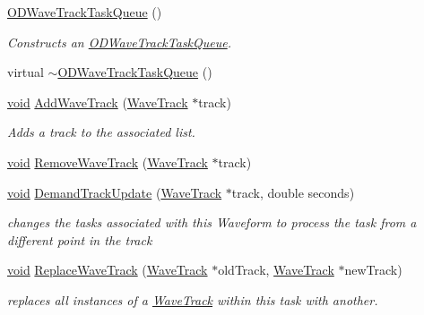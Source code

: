 \begin{DoxyCompactItemize}
\item 
\hyperlink{class_o_d_wave_track_task_queue_a1f17dcbeccc80ea43c7f17d0e57cc719}{O\+D\+Wave\+Track\+Task\+Queue} ()
\begin{DoxyCompactList}\small\item\em Constructs an \hyperlink{class_o_d_wave_track_task_queue}{O\+D\+Wave\+Track\+Task\+Queue}. \end{DoxyCompactList}\item 
virtual \hyperlink{class_o_d_wave_track_task_queue_a4dd991f46f246d38b8ccd29de965211b}{$\sim$\+O\+D\+Wave\+Track\+Task\+Queue} ()
\item 
\hyperlink{sound_8c_ae35f5844602719cf66324f4de2a658b3}{void} \hyperlink{class_o_d_wave_track_task_queue_abe296a4b592fda1425ebed95cd5368c7}{Add\+Wave\+Track} (\hyperlink{class_wave_track}{Wave\+Track} $\ast$track)
\begin{DoxyCompactList}\small\item\em Adds a track to the associated list. \end{DoxyCompactList}\item 
\hyperlink{sound_8c_ae35f5844602719cf66324f4de2a658b3}{void} \hyperlink{class_o_d_wave_track_task_queue_ae5a6b6f1492f226c786c8bc9c1a52f42}{Remove\+Wave\+Track} (\hyperlink{class_wave_track}{Wave\+Track} $\ast$track)
\item 
\hyperlink{sound_8c_ae35f5844602719cf66324f4de2a658b3}{void} \hyperlink{class_o_d_wave_track_task_queue_a50600260d6e33d0d120ab1d1178a4c20}{Demand\+Track\+Update} (\hyperlink{class_wave_track}{Wave\+Track} $\ast$track, double seconds)
\begin{DoxyCompactList}\small\item\em changes the tasks associated with this Waveform to process the task from a different point in the track \end{DoxyCompactList}\item 
\hyperlink{sound_8c_ae35f5844602719cf66324f4de2a658b3}{void} \hyperlink{class_o_d_wave_track_task_queue_a89ffe5e2d7ed615108ae59374dc44192}{Replace\+Wave\+Track} (\hyperlink{class_wave_track}{Wave\+Track} $\ast$old\+Track, \hyperlink{class_wave_track}{Wave\+Track} $\ast$new\+Track)
\begin{DoxyCompactList}\small\item\em replaces all instances of a \hyperlink{class_wave_track}{Wave\+Track} within this task with another. \end{DoxyCompactList}\item 

\end{DoxyCompactItemize}
